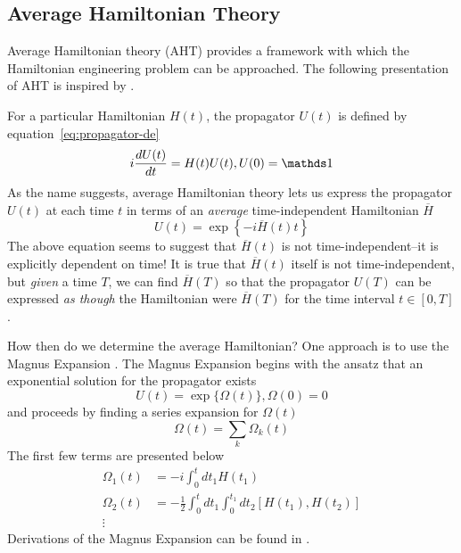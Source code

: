 \subsection{Average Hamiltonian Theory}\label{sec:AHT}

Average Hamiltonian theory (AHT) provides a framework with which the Hamiltonian engineering problem can be approached. The following presentation of AHT is inspired by \cite{brinkmann_2016, gerstein-dybowski, 1976ii}.

For a particular Hamiltonian $H(t)$, the propagator $U(t)$ is defined by equation~\ref{eq:propagator-de}
\[
i \ddt{U(t)} = H(t) U(t), U(0) = \identity
\]
As the name suggests, average Hamiltonian theory lets us express the propagator $U(t)$ at each time $t$ in terms of an \emph{average} time-independent Hamiltonian $\overline{H}$
\[
U(t) = \exp\left\{-i \overline{H}(t) t \right\}
\]
The above equation seems to suggest that $\overline{H}(t)$ is not time-independent--it is explicitly dependent on time! It is true that $\overline{H}(t)$ itself is not time-independent, but \emph{given} a time $T$, we can find $\overline{H}(T)$ so that the propagator $U(T)$ can be expressed \emph{as though} the Hamiltonian were $\overline{H}(T)$ for the time interval $t \in [0, T]$.

How then do we determine the average Hamiltonian? One approach is to use the Magnus Expansion \cite{Blanes_2009,2010EJPh...31..907B}.
The Magnus Expansion begins with the ansatz that an exponential solution for the propagator exists
\[
U(t) = \exp\{\Omega(t)\}, \Omega(0) = 0
\]
and proceeds by finding a series expansion for $\Omega(t)$
\[
\Omega(t) = \sum_k \Omega_k(t)
\]
The first few terms are presented below
\begin{align*}
    \Omega_1(t) &= -i \int_0^t dt_1 H(t_1) \\
    \Omega_2(t) &= -\frac{1}{2} \int_0^t dt_1 \int_0^{t_1} dt_2 [H(t_1), H(t_2)] \\
    \vdots
\end{align*}
Derivations of the Magnus Expansion can be found in
\cite{gerstein-dybowski,Blanes_2009,2010EJPh...31..907B}.

